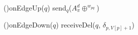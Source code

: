 
\SetInd{0.2em}{1em}

\small

\DontPrintSemicolon
\LinesNumbered

\Function(){\textup{onEdgeUp($q$)}}  {
     {
         send$_q$($A_{\pi}^{d} \oplus ^{w_{pq}}$)
    }
}


\Function(){\textup{onEdgeDown($q$)}} {
   {
       receiveDel($q$, $\delta_{p, V[p]+1}$)
  }
}



